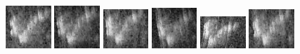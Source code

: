 \begin{figure}
    \includegraphics[width=0.15\textwidth]{chapters/images/dataset/all-class-images/hook/hook-53.jpg}
    \includegraphics[width=0.15\textwidth]{chapters/images/dataset/all-class-images/hook/hook-64.jpg}
    \includegraphics[width=0.15\textwidth]{chapters/images/dataset/all-class-images/hook/hook-94.jpg}
    \includegraphics[width=0.15\textwidth]{chapters/images/dataset/all-class-images/hook/hook-77.jpg}
    \includegraphics[width=0.15\textwidth]{chapters/images/dataset/all-class-images/hook/hook-126.jpg}
    \includegraphics[width=0.15\textwidth]{chapters/images/dataset/all-class-images/hook/hook-98.jpg}
    

\end{figure}
